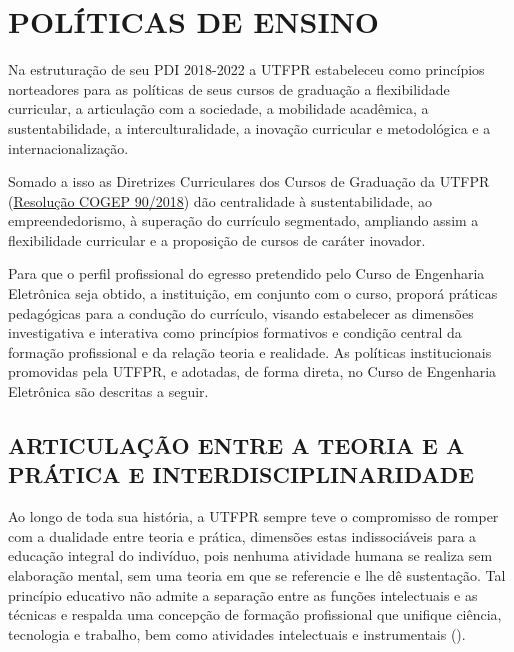 \chapter{POLÍTICAS DE ENSINO}

Na estruturação de seu PDI 2018-2022 \cite{pdiutfpr} a UTFPR estabeleceu como princípios norteadores para as políticas de seus cursos de graduação a flexibilidade curricular, a articulação com a sociedade, a mobilidade acadêmica, a sustentabilidade, a interculturalidade, a inovação curricular e metodológica e a internacionalização.

Somado a isso as Diretrizes Curriculares dos Cursos de Graduação da UTFPR (\href{https://sei.utfpr.edu.br/sei/publicacoes/controlador_publicacoes.php?acao=publicacao_visualizar&id_documento=888276&id_orgao_publicacao=0}{Resolução COGEP 90/2018}) dão centralidade à sustentabilidade, ao empreendedorismo, à superação do currículo segmentado, ampliando assim a flexibilidade curricular e a proposição de cursos de caráter inovador.

Para que o perfil profissional do egresso pretendido pelo Curso de Engenharia Eletrônica seja obtido, a instituição, em conjunto com o curso, proporá práticas pedagógicas para a condução do currículo, visando estabelecer as dimensões investigativa e interativa como princípios formativos e condição central da formação profissional e da relação teoria e realidade. As políticas institucionais promovidas pela UTFPR, e adotadas, de forma direta, no Curso de Engenharia Eletrônica são descritas a seguir.

\section{ARTICULAÇÃO ENTRE A TEORIA E A PRÁTICA E INTERDISCIPLINARIDADE}
\label{sec:artc}

Ao longo de toda sua história, a UTFPR sempre teve o compromisso de romper com a dualidade entre teoria e prática, dimensões estas indissociáveis para a educação integral do indivíduo, pois nenhuma atividade humana se realiza sem elaboração mental, sem uma teoria em que se referencie e lhe dê sustentação. Tal princípio educativo não admite a separação entre as funções intelectuais e as técnicas e respalda uma concepção de formação profissional que unifique ciência, tecnologia e trabalho, bem como atividades intelectuais e instrumentais ().

